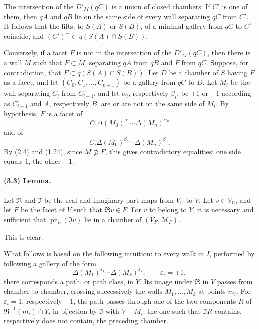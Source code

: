 \documentclass[10pt]{article}
\newcommand{\C}{\mathbb C}
\begin{document}
The intersection of the \(D'_M(qC)\) is a union of closed chambers. If \(C'\) is one of them, then \(qA\) and \(qB\) lie on the same side of every wall separating \(qC\) from \(C'\). It follows that the lifts, to \(S(A)\) or \(S(B)\), of a minimal gallery from \(qC\) to \(C'\) coincide, and \((C')^{-}\subset q(S(A)\cap S(B))\).

Conversely, if a facet \(F\) is not in the intersection of the \(D'_M(qC)\), then there is a wall \(M\) such that \(F\subset M\), separating \(qA\) from \(qB\) and \(F\) from \(qC\). Suppose, for contradiction, that \(F\subset q(S(A)\cap S(B))\). Let \(D\) be a chamber of \(S\) having \(F\) as a facet, and let \((C_0,C_1,\ldots,C_{n+1})\) be a gallery from \(qC\) to \(D\). Let \(M_i\) be the wall separating \(C_i\) from \(C_{i+1}\), and let \(\alpha_i\), respectively \(\beta_i\), be \(+1\) or \(-1\) according as \(C_{i+1}\) and \(A\), respectively \(B\), are or are not on the same side of \(M_i\). By hypothesis, \(F\) is a facet of
\[
C.\Delta(M_0)^{\alpha_0}\cdots \Delta(M_n)^{\alpha_n}
\]
and of
\[
C.\Delta(M_0)^{\beta_0}\cdots \Delta(M_n)^{\beta_n}.
\]
By (2.4) and (1.24), since \(M\not\supset F\), this gives contradictory equalities: one side equals \(1\), the other \(-1\).

\paragraph{(3.3) Lemma.} Let \(\Re\) and \(\Im\) be the real and imaginary part maps from \(V_\C\) to \(V\). Let \(v\in V_\C\), and let \(F\) be the facet of \(V\) such that \(\Re v\in F\). For \(v\) to belong to \(Y\), it is necessary and sufficient that \(\operatorname{pr}_F(\Im v)\) lie in a chamber of \((V_F,\mathcal M_F)\).

This is clear.

What follows is based on the following intuition: to every walk in \(I\), performed by following a gallery of the form
\[
\Delta(M_1)^{\varepsilon_1}\cdots \Delta(M_k)^{\varepsilon_k},\qquad \varepsilon_i=\pm1,
\]
there corresponds a path, or path class, in \(Y\). Its image under \(\Re\) in \(V\) passes from chamber to chamber, crossing successively the walls \(M_1,\ldots,M_k\) at points \(m_i\). For \(\varepsilon_i=1\), respectively \(-1\), the path passes through one of the two components \(R\) of \(\Re^{-1}(m_i)\cap Y\), in bijection by \(\Im\) with \(V-M_i\): the one such that \(\Im R\) contains, respectively does not contain, the preceding chamber.
\end{document}

